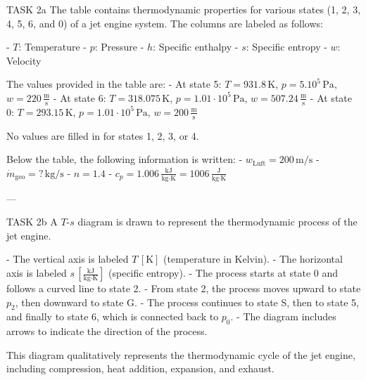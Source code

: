TASK 2a  
The table contains thermodynamic properties for various states (1, 2, 3, 4, 5, 6, and 0) of a jet engine system. The columns are labeled as follows:  

- \( T \): Temperature  
- \( p \): Pressure  
- \( h \): Specific enthalpy  
- \( s \): Specific entropy  
- \( w \): Velocity  

The values provided in the table are:  
- At state 5:  
  \( T = 931.8 \, \text{K} \), \( p = 5.10^5 \, \text{Pa} \), \( w = 220 \, \frac{\text{m}}{\text{s}} \)  
- At state 6:  
  \( T = 318.075 \, \text{K} \), \( p = 1.01 \cdot 10^5 \, \text{Pa} \), \( w = 507.24 \, \frac{\text{m}}{\text{s}} \)  
- At state 0:  
  \( T = 293.15 \, \text{K} \), \( p = 1.01 \cdot 10^5 \, \text{Pa} \), \( w = 200 \, \frac{\text{m}}{\text{s}} \)  

No values are filled in for states 1, 2, 3, or 4.  

Below the table, the following information is written:  
- \( w_{\text{Luft}} = 200 \, \text{m/s} \)  
- \( \dot{m}_{\text{geo}} = ? \, \text{kg/s} \)  
- \( n = 1.4 \)  
- \( c_p = 1.006 \, \frac{\text{kJ}}{\text{kg·K}} = 1006 \, \frac{\text{J}}{\text{kg·K}} \)  

---

TASK 2b  
A \( T \)-\( s \) diagram is drawn to represent the thermodynamic process of the jet engine.  

- The vertical axis is labeled \( T \, [\text{K}] \) (temperature in Kelvin).  
- The horizontal axis is labeled \( s \, [\frac{\text{kJ}}{\text{kg·K}}] \) (specific entropy).  
- The process starts at state 0 and follows a curved line to state 2.  
- From state 2, the process moves upward to state \( p_2 \), then downward to state G.  
- The process continues to state S, then to state 5, and finally to state 6, which is connected back to \( p_0 \).  
- The diagram includes arrows to indicate the direction of the process.  

This diagram qualitatively represents the thermodynamic cycle of the jet engine, including compression, heat addition, expansion, and exhaust.